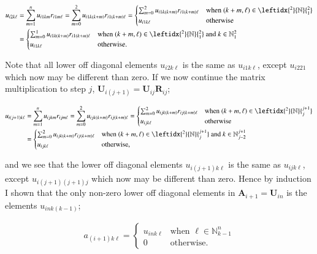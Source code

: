 \documentclass[11pt,english,a4paper]{article}
\begin{document}
\begin{flushleft}
\begin{align*}
u_{i2k\ell} &= \sum_{m=1}^n u_{i1km} r_{i1m\ell} = \sum_{m=0}^2 u_{i1k(k+m)} r_{i1(k+m)\ell} 
= \begin{cases} \sum_{m=0}^2 u_{i1k(k+m)} r_{i1(k+m)\ell} & \text{when } (k+m,\ell)\in{\leftidx{^2}{\mathbb{N}}{_1^2}} \\ u_{i1k\ell} & \text{otherwise} \end{cases}
\\
&= \begin{cases} \sum_{m=0}^1 u_{i1k(k+m)} r_{i1(k+m)\ell} & \text{when } (k+m,\ell)\in{\leftidx{^2}{\mathbb{N}}{_{1}^2}} \text{ and } k\in\mathbb{N}_1^2  \\ u_{i1k\ell} & \text{otherwise.} \end{cases}
\end{align*} 

Note that all lower off diagonal elements $u_{i2k\ell}$ is the same as $u_{i1k\ell}$, except $u_{i221}$ which now may be different than zero. If we now continue the matrix multiplication to step $j$, $\textbf{U}_{i(j+1)} = \textbf{U}_{ij}\textbf{R}_{ij}$;

\begin{align}
u_{i(j+1)k\ell} &= \sum_{m=1}^n u_{ijkm} r_{ijm\ell} = \sum_{m=0}^2 u_{ijk(k+m)} r_{ij(k+m)\ell} 
= \begin{cases} \sum_{m=0}^2 u_{ijk(k+m)} r_{ij(k+m)\ell} & \text{when } (k+m,\ell)\in{\leftidx{^2}{\mathbb{N}}{_{j}^{j+1}}} \\ u_{ijk\ell} & \text{otherwise} \end{cases}
\nonumber\\
&= \begin{cases} \sum_{m=0}^2 u_{ijk(k+m)} r_{ij(k+m)\ell} & \text{when } (k+m,\ell)\in{\leftidx{^2}{\mathbb{N}}{_{j}^{j+1}}} \text{ and } k\in\mathbb{N}_{j-2}^{j+1}  \\ u_{ijk\ell} & \text{otherwise,} \end{cases}
\label{eq_25}
\end{align}

and we see that the lower off diagonal elements $u_{i(j+1)k\ell}$ is the same as $u_{ijk\ell}$, except $u_{i(j+1)(j+1)j}$ which now may be different than zero. Hence by induction I shown that the only non-zero lower off diagonal elements in $\textbf{A}_{i+1}=\textbf{U}_{in}$ is the elements $u_{ink(k-1)}$;

\begin{align}
a_{(i+1)k\ell} = \begin{cases} u_{ink\ell} & \text{when } \ell\in\mathbb{N}_{k-1}^n \\ 0 & \text{otherwise.} \end{cases}
\label{eq_26}
\end{align}


\end{flushleft}
\end{document}
